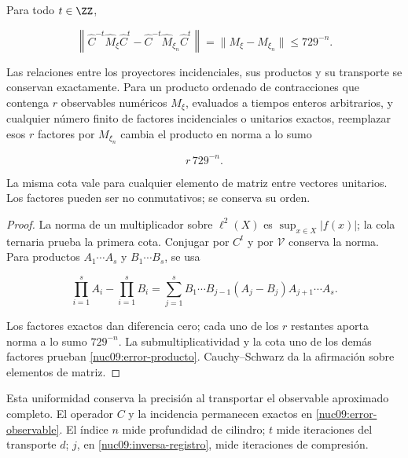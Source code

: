\begin{theorem}
\label{nuc09:precision}
Para todo \(t\in\ZZ\),



\begin{equation}
\boxed{
\left\|\widehat C^{-t}\widehat M_\xi\widehat C^t
-\widehat C^{-t}\widehat M_{\xi_n}\widehat C^t\right\|
=\|M_\xi-M_{\xi_n}\|\le729^{-n}.}
\label{nuc09:error-observable}
\end{equation}



Las relaciones entre los proyectores incidenciales, sus productos
y su transporte se conservan exactamente.
Para un producto ordenado de contracciones que contenga \(r\)
observables numéricos \(M_\xi\), evaluados a tiempos enteros
arbitrarios, y cualquier número finito de factores incidenciales
o unitarios exactos, reemplazar esos \(r\) factores por
\(M_{\xi_n}\) cambia el producto en norma a lo sumo



\begin{equation}
\boxed{r\,729^{-n}.}
\label{nuc09:error-producto}
\end{equation}



La misma cota vale para cualquier elemento de matriz entre vectores
unitarios. Los factores pueden ser no conmutativos; se conserva su orden.
\end{theorem}

\begin{proof}
La norma de un multiplicador sobre \(\ell^2(X)\) es
\(\sup_{x\in X}|f(x)|\); la cola ternaria prueba la primera cota.
Conjugar por \(C^t\) y por \(\mathcal V\) conserva la norma.
Para productos \(A_1\cdots A_s\) y \(B_1\cdots B_s\), se usa



\[
\prod_{i=1}^s A_i-\prod_{i=1}^s B_i
=\sum_{j=1}^s B_1\cdots B_{j-1}(A_j-B_j)A_{j+1}\cdots A_s.
\]



Los factores exactos dan diferencia cero; cada uno de los \(r\)
restantes aporta norma a lo sumo \(729^{-n}\).
La submultiplicatividad y la cota uno de los demás factores prueban
\eqref{nuc09:error-producto}.
Cauchy--Schwarz da la afirmación sobre elementos de matriz.
\end{proof}

Esta uniformidad conserva la precisión al transportar el observable
aproximado completo. El operador \(C\) y la incidencia permanecen
exactos en \eqref{nuc09:error-observable}.
El índice \(n\) mide profundidad de cilindro; \(t\) mide iteraciones
del transporte \(d\); \(j\), en \eqref{nuc09:inversa-registro},
mide iteraciones de compresión.


